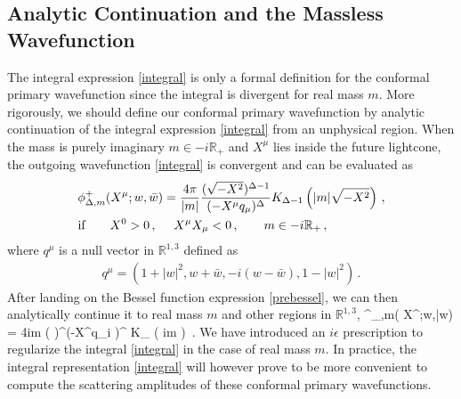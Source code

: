 \documentclass[12pt]{article}
\numberwithin{equation}{section}
\def\be#1\ee{\begin{align}#1\end{align}}
\begin{document}
\subsection{Analytic Continuation and the Massless Wavefunction}
The integral expression \eqref{integral} is only a formal definition for the conformal primary wavefunction since the integral is divergent for real mass $m$.  More rigorously, we should define our conformal primary wavefunction by analytic continuation of the integral expression \eqref{integral} from an unphysical region.  When the mass is  purely imaginary $m\in -i \mathbb{R}_+$ and $X^\mu$ lies inside the future lightcone, the outgoing wavefunction \eqref{integral} is convergent and can be evaluated as
\begin{align}\label{prebessel}
&\phi^+_{\Delta,m}( X^\mu;w,\bar w)  = {4\pi\over |m|} {(\sqrt{-X^2} )^{\Delta-1}\over (-X^\mu q_\mu)^\Delta} K_{\Delta-1} \left( |m|\sqrt{-X^2}\right)\,,\notag\\
&\text{if}~~~~~~X^0>0\,,~~~~X^\mu X_\mu <0\,,~~~~~~m\in -i\mathbb{R}_+\,,
\end{align}\label{null}
where $q^\mu$ is a null vector in $\mathbb{R}^{1,3}$ defined as
\begin{align}
q^\mu = \left( 1+|w|^2 , w+\bar w, -i (w-\bar w) , 1-|w|^2\right)\,.
\end{align}
After landing on the Bessel function expression \eqref{prebessel}, we can then analytically continue it to real mass $m$ and other regions in $\mathbb{R}^{1,3}$, 
\be \label{asf}\phi^\pm_{\Delta,m}( X^\mu;w,\bar w)  = {4\pi\over im} {( )^{}\over (-X^\mu q_\mu \mp i \epsilon)^\Delta} K_{} \left( im \right) \,.\ee
We have introduced an $i\epsilon$ prescription to regularize the integral \eqref{integral} in the case of real mass $m$. 
In practice, the integral representation \eqref{integral} will however prove to be more convenient to compute the scattering amplitudes of these conformal primary wavefunctions.
\end{document}
